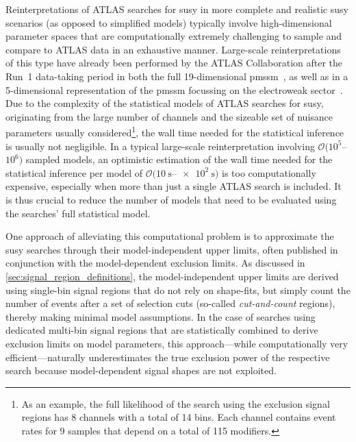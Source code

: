 Reinterpretations of ATLAS searches for \gls{susy} in more complete and realistic \gls{susy} scenarios (as opposed to simplified models) typically involve high-dimensional parameter spaces that are computationally extremely challenging to sample and compare to ATLAS data in an exhaustive manner.
Large-scale reinterpretations of this type have already been performed by the ATLAS Collaboration after the Run~1 data-taking period in both the full 19-dimensional \gls{pmssm}~\cite{pMSSM-scan-run1:2015baa}, as well as in a 5-dimensional representation of the \gls{pmssm} focussing on the electroweak sector~\cite{Aaboud:2016wna}.
Due to the complexity of the statistical models of ATLAS searches for \gls{susy}, originating from the large number of channels and the sizeable set of nuisance parameters usually considered\footnote{As an example, the full likelihood of the \onelepton search using the exclusion signal regions has 8 channels with a total of 14 bins. Each channel contains event rates for 9 samples that depend on a total of 115 modifiers.}, the wall time needed for the statistical inference is usually not negligible.
In a typical large-scale reinterpretation involving \mbox{$\mathcal{O}(10^5$--$10^6)$} sampled models, an optimistic estimation of the wall time needed for the statistical inference per model of \mbox{$\mathcal{O}(\SI{10}{\second}$--$\SI{e2}{\second})$} is too computationally expensive, especially when more than just a single ATLAS search is included.
It is thus crucial to reduce the number of models that need to be evaluated using the searches' full statistical model.

One approach of alleviating this computational problem is to approximate the \gls{susy} searches through their model-independent upper limits, often published in conjunction with the model-dependent exclusion limits.
As discussed in \cref{sec:signal_region_definitions}, the model-independent upper limits are derived using single-bin signal regions that do not rely on shape-fits, but simply count the number of events after a set of selection cuts (so-called \textit{cut-and-count} regions), thereby making minimal model assumptions.
In the case of searches using dedicated multi-bin signal regions that are statistically combined to derive exclusion limits on model parameters, this approach---while computationally very efficient---naturally underestimates the true exclusion power of the respective search because model-dependent signal shapes are not exploited.

